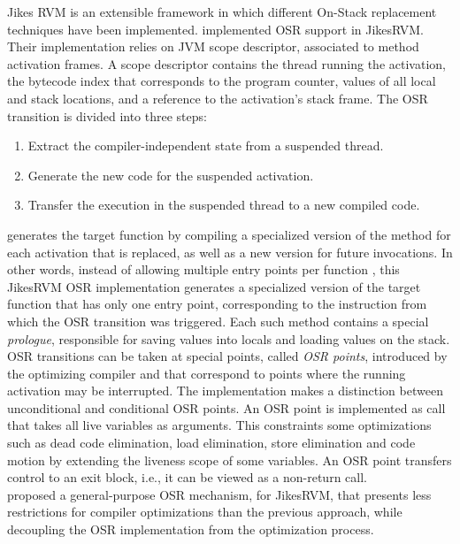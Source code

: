 Jikes RVM is an extensible framework in which different On-Stack replacement techniques have been implemented.
 implemented OSR support in JikesRVM. 
Their implementation relies on JVM scope descriptor, associated to method activation frames.
A scope descriptor contains the thread running the activation, the bytecode index that corresponds to the program counter, values of all local and stack locations, and a reference to the activation's stack frame.
The OSR transition is divided into three steps: 
\begin{enumerate}
    \item Extract the compiler-independent state from a suspended thread. 
    \item Generate the new code for the suspended activation.
    \item Transfer the execution in the suspended thread to a new compiled code.
\end{enumerate}
 generates the target function by compiling a specialized version of the method for each activation that is replaced, as well as a new version for future invocations.
In other words, instead of allowing multiple entry points per function \cite{lameed2013modular, paleczny2001java}, this JikesRVM OSR implementation generates a specialized version of the target function that has only one entry point, corresponding to the instruction from which the OSR transition was triggered.
Each such method contains a special \textit{prologue}, responsible for saving values into locals and loading values on the stack.
OSR transitions can be taken at special points, called \textit{OSR points}, introduced by the optimizing compiler and that correspond to points where the running activation may be interrupted.
The implementation makes a distinction between unconditional and conditional OSR points.
An OSR point is implemented as call that takes all live variables as arguments. 
This constraints some optimizations such as dead code elimination, load elimination, store elimination and code motion by extending the liveness scope of some variables.
An OSR point transfers control to an exit block, i.e., it can be viewed as a non-return call.\\

 proposed a general-purpose OSR mechanism, for JikesRVM, that presents less restrictions for compiler optimizations than the previous approach, while decoupling the OSR implementation from the optimization process.



